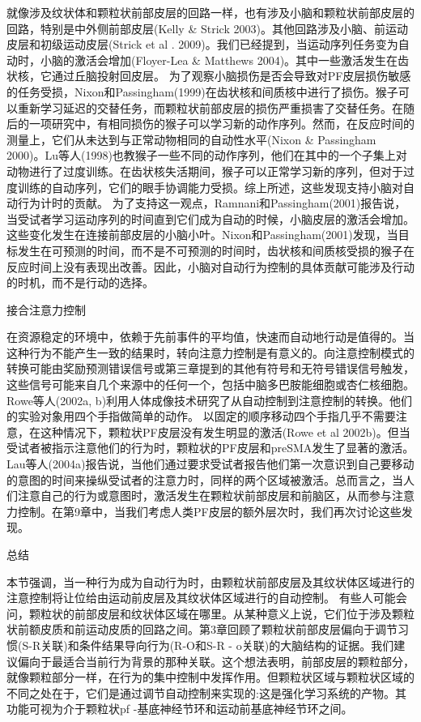 就像涉及纹状体和颗粒状前部皮层的回路一样，也有涉及小脑和颗粒状前部皮层的回路，特别是中外侧前部皮层(Kelly \& Strick 2003)。其他回路涉及小脑、前运动皮层和初级运动皮层(Strick et al . 2009)。我们已经提到，当运动序列任务变为自动时，小脑的激活会增加(Floyer-Lea \& Matthews 2004)。其中一些激活发生在齿状核，它通过丘脑投射回皮层。
为了观察小脑损伤是否会导致对PF皮层损伤敏感的任务受损，Nixon和Passingham(1999)在齿状核和间质核中进行了损伤。猴子可以重新学习延迟的交替任务，而颗粒状前部皮层的损伤严重损害了交替任务。在随后的一项研究中，有相同损伤的猴子可以学习新的动作序列。然而，在反应时间的测量上，它们从未达到与正常动物相同的自动性水平(Nixon \& Passingham 2000)。Lu等人(1998)也教猴子一些不同的动作序列，他们在其中的一个子集上对动物进行了过度训练。在齿状核失活期间，猴子可以正常学习新的序列，但对于过度训练的自动序列，它们的眼手协调能力受损。综上所述，这些发现支持小脑对自动行为计时的贡献。
为了支持这一观点，Ramnani和Passingham(2001)报告说，当受试者学习运动序列的时间直到它们成为自动的时候，小脑皮层的激活会增加。这些变化发生在连接前部皮层的小脑小叶。Nixon和Passingham(2001)发现，当目标发生在可预测的时间，而不是不可预测的时间时，齿状核和间质核受损的猴子在反应时间上没有表现出改善。因此，小脑对自动行为控制的具体贡献可能涉及行动的时机，而不是行动的选择。

接合注意力控制

在资源稳定的环境中，依赖于先前事件的平均值，快速而自动地行动是值得的。当这种行为不能产生一致的结果时，转向注意力控制是有意义的。向注意控制模式的转换可能由奖励预测错误信号或第三章提到的其他有符号和无符号错误信号触发，这些信号可能来自几个来源中的任何一个，包括中脑多巴胺能细胞或杏仁核细胞。
Rowe等人(2002a, b)利用人体成像技术研究了从自动控制到注意控制的转换。他们的实验对象用四个手指做简单的动作。
以固定的顺序移动四个手指几乎不需要注意，在这种情况下，颗粒状PF皮层没有发生明显的激活(Rowe et al 2002b)。但当受试者被指示注意他们的行为时，颗粒状的PF皮层和preSMA发生了显著的激活。Lau等人(2004a)报告说，当他们通过要求受试者报告他们第一次意识到自己要移动的意图的时间来操纵受试者的注意力时，同样的两个区域被激活。总而言之，当人们注意自己的行为或意图时，激活发生在颗粒状前部皮层和前脑区，从而参与注意力控制。在第9章中，当我们考虑人类PF皮层的额外层次时，我们再次讨论这些发现。

总结

本节强调，当一种行为成为自动行为时，由颗粒状前部皮层及其纹状体区域进行的注意控制将让位给由运动前皮层及其纹状体区域进行的自动控制。
有些人可能会问，颗粒状的前部皮层和纹状体区域在哪里。从某种意义上说，它们位于涉及颗粒状前额皮质和前运动皮质的回路之间。第3章回顾了颗粒状前部皮层偏向于调节习惯(S-R关联)和条件结果导向行为(R-O和S-R - o关联)的大脑结构的证据。我们建议偏向于最适合当前行为背景的那种关联。这个想法表明，前部皮层的颗粒部分，就像颗粒部分一样，在行为的集中控制中发挥作用。但颗粒状区域与颗粒状区域的不同之处在于，它们是通过调节自动控制来实现的:这是强化学习系统的产物。其功能可视为介于颗粒状pf -基底神经节环和运动前基底神经节环之间。

